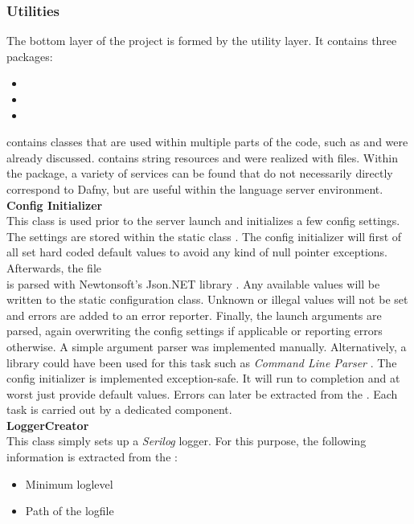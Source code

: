 \subsubsection{Utilities}
The bottom layer of the project is formed by the utility layer.
It contains three packages:
\begin{itemize}
    \item {}
    \item {}
    \item {}
\end{itemize}
 contains classes that are used within multiple parts of the code, such as  and were already discussed.
 contains string resources and were realized with  files.
Within the  package,
a variety of services can be found that do not necessarily directly correspond to Dafny,
but are useful within the language server environment.\\

\textbf{Config Initializer}\\
This class is used prior to the server launch and initializes a few config settings.
The settings are stored within the static class .
The config initializer will first of all set hard coded default values to avoid any kind of null pointer exceptions.
Afterwards, the file \\
 is parsed with Newtonsoft's Json.NET library \cite{jsondotnet}.
Any available values will be written to the static configuration class.
Unknown or illegal values will not be set and errors are added to an error reporter.
Finally, the launch arguments are parsed, again overwriting the config settings if applicable or reporting errors otherwise.
A simple argument parser was implemented manually.
Alternatively, a library could have been used for this task such as \textit{Command Line Parser} \cite{clparser}.
The config initializer is implemented exception-safe.
It will run to completion and at worst just provide default values.
Errors can later be extracted from the .
Each task is carried out by a dedicated component.\\

\textbf{LoggerCreator}\\
This class simply sets up a \textit{Serilog} \cite{serilog} logger.
For this purpose, the following information is extracted from the :
\begin{itemize}
    \item Minimum loglevel
    \item Path of the logfile
\end{itemize}

